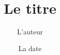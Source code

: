 \documentclass[10pt]{book}
\title{Le titre}
\author{L'auteur}
\date{La date}
\begin{document}

\pagebreak

\pagebreak

\end{document}
